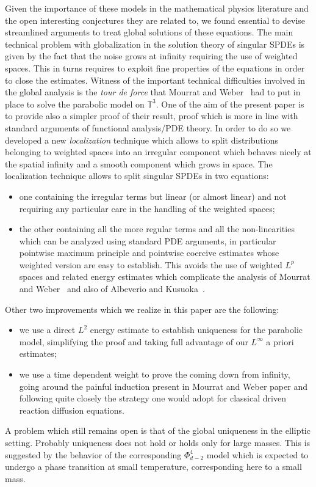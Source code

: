 \documentclass[a4paper,11pt]{article}
\numberwithin{equation}{section}
\newcommand{\8}{\infty}
\begin{document}
Given the importance of these models in the mathematical physics literature and the open interesting conjectures they are related to, we found essential to devise streamlined arguments to treat global solutions of these equations. The main technical problem with globalization in the solution theory of singular SPDEs is given by the fact that the noise grows at infinity requiring the use of weighted spaces. This in turns requires to exploit fine properties of the equations in order to close the estimates. Witness of the important technical difficulties involved in the global analysis is the \emph{tour de force} that Mourrat and Weber~\cite{MWcomedown} had to put in place to solve the parabolic model on $\mathbb{T}^3$. One of the aim of the present paper is to provide also a simpler proof of their result, proof which is more in line with standard arguments of functional analysis/PDE theory. 
In order to do so we developed a new \emph{localization} technique which allows to split distributions belonging to weighted spaces into an irregular component which behaves nicely at the spatial infinity and a smooth component which grows in space. The localization technique allows to split singular SPDEs in two equations:
\begin{itemize}
\item[-]
 one containing the irregular terms but linear (or almost linear) and not requiring any particular care in the handling of the weighted spaces;
 \item[-] the other containing all the more regular terms and all the non-linearities which can be analyzed using standard PDE arguments, in particular pointwise maximum principle and  pointwise coercive estimates whose weighted version are easy to establish. This avoids the use of weighted $L^p$ spaces and related energy estimates which complicate the analysis of Mourrat and Weber~\cite{MWcomedown} and also of  Albeverio and Kusuoka~\cite{albeverio_invariant_2017}.
\end{itemize}
Other two improvements which we realize in this paper are the following:
\begin{itemize}
\item[a)] we use a direct $L^2$ energy estimate to establish uniqueness for the parabolic model, simplifying the proof and taking full advantage of our $L^\infty$ a priori estimates;
\item[b)] we use a time dependent weight to prove the coming down from infinity, going around the painful induction present in Mourrat and Weber paper and following quite closely the strategy one would adopt for classical driven reaction diffusion equations.
\end{itemize}
A problem which still remains open is that of the global uniqueness in the elliptic setting. Probably uniqueness does not hold or holds only for large masses. This is suggested by the behavior of the corresponding $\Phi^4_{d-2}$ model which is expected to undergo a phase transition at small temperature, corresponding here to a small mass.
\end{document}
